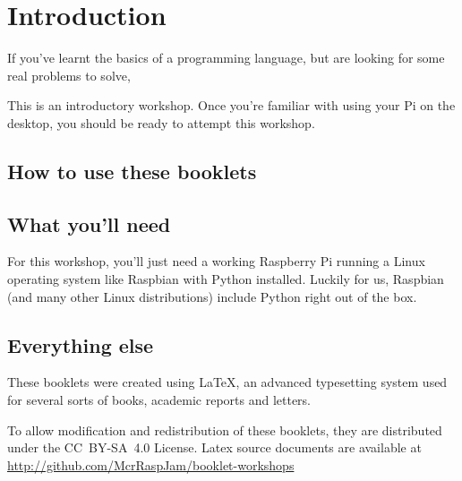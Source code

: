 \setcounter{section}{-1}
\section{Introduction}

	If you've learnt the basics of a programming language, but are looking for some real problems to solve, 



	This is an introductory workshop. Once you're familiar with using your Pi on the desktop, you should be ready to attempt this workshop.

	\subsection*{How to use these booklets}

		

		
		


	\subsection*{What you'll need}

		For this workshop, you'll just need a working Raspberry Pi running a Linux operating system like Raspbian with Python installed. Luckily for us, Raspbian (and many other Linux distributions) include Python right out of the box.

	\subsection*{Everything else}

		\ifprint\else These booklets were created using \textrm{\LaTeX}, an advanced typesetting system used for several sorts of books, academic reports and letters. \fi

		To allow modification and redistribution of these booklets, they are distributed under the \hbox{CC BY-SA 4.0} License.
		Latex source documents are available at \url{http://github.com/McrRaspJam/booklet-workshops}
